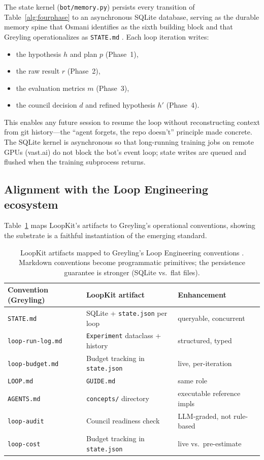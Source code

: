 The state kernel (\texttt{bot/memory.py}) persists every transition of
Table~\ref{alg:fourphase} to an asynchronous SQLite database, serving as the
durable memory spine that Osmani identifies as the sixth building block
\citep{osmani2026loop} and that Greyling operationalizes as
\texttt{STATE.md} \citep{greyling2026loop}. Each loop iteration writes:
\begin{itemize}
  \item the hypothesis $h$ and plan $p$ (Phase~1),
  \item the raw result $r$ (Phase~2),
  \item the evaluation metrics $m$ (Phase~3),
  \item the council decision $d$ and refined hypothesis $h'$ (Phase~4).
\end{itemize}
This enables any future session to resume the loop without reconstructing
context from git history---the ``agent forgets, the repo doesn't'' principle
made concrete. The SQLite kernel is asynchronous so that long-running
training jobs on remote GPUs (vast.ai) do not block the bot's event loop;
state writes are queued and flushed when the training subprocess returns.

\subsection{Alignment with the Loop Engineering ecosystem}
\label{sec:loopkit:ecosystem}

Table~\ref{tab:ecosystem} maps LoopKit's artifacts to Greyling's operational
conventions, showing the substrate is a faithful instantiation of the
emerging standard.

\begin{table}[h]
\centering
\caption{LoopKit artifacts mapped to Greyling's Loop Engineering conventions
\citep{greyling2026loop}. Markdown conventions become programmatic
primitives; the persistence guarantee is stronger (SQLite vs.\ flat files).}
\label{tab:ecosystem}
\begin{tabular}{lll}
\toprule
Convention (Greyling) & LoopKit artifact & Enhancement \\
\midrule
\texttt{STATE.md}          & SQLite + \texttt{state.json} per loop & queryable, concurrent \\
\texttt{loop-run-log.md}   & \texttt{Experiment} dataclass + history & structured, typed \\
\texttt{loop-budget.md}    & Budget tracking in \texttt{state.json} & live, per-iteration \\
\texttt{LOOP.md}           & \texttt{GUIDE.md} & same role \\
\texttt{AGENTS.md}         & \texttt{concepts/} directory & executable reference impls \\
\texttt{loop-audit}        & Council readiness check & LLM-graded, not rule-based \\
\texttt{loop-cost}         & Budget tracking in \texttt{state.json} & live vs.\ pre-estimate \\
\bottomrule
\end{tabular}
\end{table}

